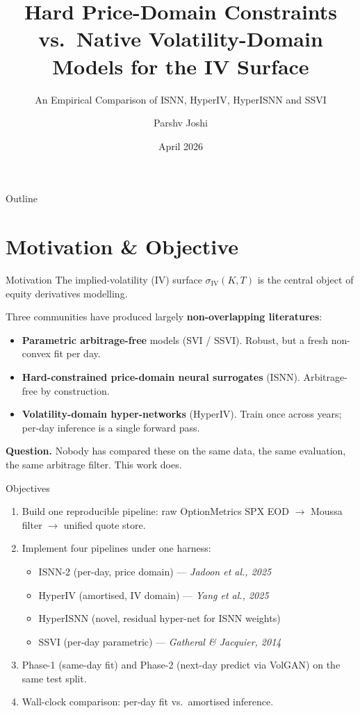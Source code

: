 \documentclass[10pt,aspectratio=169]{beamer}
\title[IV Surface: Price vs Vol Domain]{Hard Price-Domain Constraints vs.\ Native Volatility-Domain Models for the IV Surface}
\subtitle{An Empirical Comparison of ISNN, HyperIV, HyperISNN and SSVI}
\author[Parshv Joshi]{Parshv Joshi}
\institute[]{\small Under the mentorship of Prof.\ Abhishek Tilva}
\date[April 2026]{April 2026}
\newcommand{\iv}{\sigma_{\mathrm{IV}}}
\begin{document}
\begin{frame}
\titlepage
\end{frame}

\begin{frame}{Outline}
\tableofcontents
\end{frame}

\section{Motivation \& Objective}

\begin{frame}{Motivation}
The implied-volatility (IV) surface $\iv(K, T)$ is the central object of equity derivatives modelling.\medskip

Three communities have produced largely \textbf{non-overlapping literatures}:
\begin{itemize}
  \item \textbf{Parametric arbitrage-free} models (SVI / SSVI). Robust, but a fresh non-convex fit per day.
  \item \textbf{Hard-constrained price-domain neural surrogates} (ISNN). Arbitrage-free by construction.
  \item \textbf{Volatility-domain hyper-networks} (HyperIV). Train once across years; per-day inference is a single forward pass.
\end{itemize}\medskip

\textbf{Question.} Nobody has compared these on the same data, the same evaluation, the same arbitrage filter. This work does.
\end{frame}

\begin{frame}{Objectives}
\begin{enumerate}
  \item Build one reproducible pipeline: raw OptionMetrics SPX EOD $\to$ Moussa filter $\to$ unified quote store.
  \item Implement four pipelines under one harness:
    \begin{itemize}\small
      \item[A.] ISNN-2 (per-day, price domain) --- \textit{Jadoon et al., 2025}
      \item[B.] HyperIV (amortised, IV domain) --- \textit{Yang et al., 2025}
      \item[C.] HyperISNN (novel, residual hyper-net for ISNN weights)
      \item[D.] SSVI (per-day parametric) --- \textit{Gatheral \& Jacquier, 2014}
    \end{itemize}
  \item Phase-1 (same-day fit) and Phase-2 (next-day predict via VolGAN) on the same test split.
  \item Wall-clock comparison: per-day fit vs.\ amortised inference.
\end{enumerate}
\end{frame}
\end{document}
